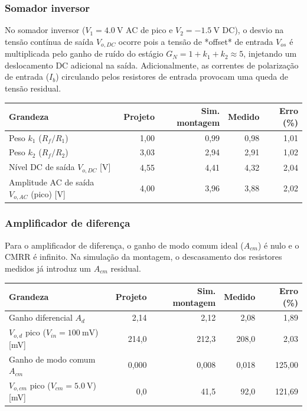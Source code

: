 \documentclass[11pt,a4paper]{article}
\begin{document}
\subsubsection{Somador inversor}

No somador inversor ($V_1 = \SI{4,0}{\volt}$ AC de pico e $V_2 = \SI{-1,5}{\volt}$ DC), o desvio na tensão contínua de saída $V_{o,DC}$ ocorre pois a tensão de *offset* de entrada $V_{os}$ é multiplicada pelo ganho de ruído do estágio $G_N = 1 + k_1 + k_2 \approx 5$, injetando um deslocamento DC adicional na saída. Adicionalmente, as correntes de polarização de entrada ($I_b$) circulando pelos resistores de entrada provocam uma queda de tensão residual.

\begin{center}
\begin{tabular}{@{}lrrrr@{}}
\toprule
\textbf{Grandeza} & \textbf{Projeto} & \textbf{Sim. montagem} & \textbf{Medido} & \textbf{Erro (\%)} \\
\midrule
Peso $k_1$ ($R_f/R_1$) & 1,00 & 0,99 & 0,98 & 1,01 \\
Peso $k_2$ ($R_f/R_2$) & 3,03 & 2,94 & 2,91 & 1,02 \\
Nível DC de saída $V_{o,DC}$ [\si{\volt}] & 4,55 & 4,41 & 4,32 & 2,04 \\
Amplitude AC de saída $V_{o,AC}$ (pico) [\si{\volt}] & 4,00 & 3,96 & 3,88 & 2,02 \\
\bottomrule
\end{tabular}
\end{center}

\subsubsection{Amplificador de diferença}

Para o amplificador de diferença, o ganho de modo comum ideal ($A_{cm}$) é nulo e o $\text{CMRR}$ é infinito. Na simulação da montagem, o descasamento dos resistores medidos já introduz um $A_{cm}$ residual. 

\begin{center}
\begin{tabular}{@{}lrrrr@{}}
\toprule
\textbf{Grandeza} & \textbf{Projeto} & \textbf{Sim. montagem} & \textbf{Medido} & \textbf{Erro (\%)} \\
\midrule
Ganho diferencial $A_d$ & 2,14 & 2,12 & 2,08 & 1,89 \\
$V_{o,d}$ pico ($V_{in} = \SI{100}{\milli\volt}$) [\si{\milli\volt}] & 214,0 & 212,3 & 208,0 & 2,03 \\
Ganho de modo comum $A_{cm}$ & 0,000 & 0,008 & 0,018 & 125,00 \\
$V_{o,cm}$ pico ($V_{cm} = \SI{5,0}{\volt}$) [\si{\milli\volt}] & 0,0 & 41,5 & 92,0 & 121,69 \\
\bottomrule
\end{tabular}
\end{center}
\end{document}
